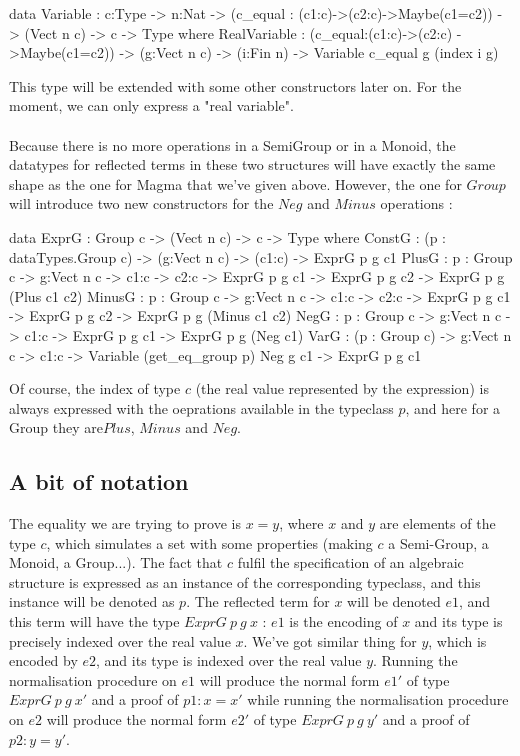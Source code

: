 \documentclass{sigplanconf}
\begin{document}
\begin{code}[caption=Reflected variables, captionpos=b, label=lst1:haskell2]  
data Variable : {c:Type} -> {n:Nat}
  -> (c_equal : (c1:c)->(c2:c)->Maybe(c1=c2)) 
  -> (Vect n c) -> c -> Type where
    RealVariable : (c_equal:(c1:c)->(c2:c)
                    ->Maybe(c1=c2))
          -> (g:Vect n c) -> (i:Fin n) 
          -> Variable c_equal g (index i g) 
\end{code}	

This type will be extended with some other constructors later on. For the moment, we can only express a "real variable". \\
\\
Because there is no more operations in a SemiGroup or in a Monoid, the datatypes for reflected terms in these two structures will have exactly the same shape as the one for Magma that we've given above.
However, the one for $Group$ will introduce two new constructors for the $Neg$ and $Minus$ operations :

\begin{code}[caption=Reflected terms in a Group, captionpos=b, label=lst1:haskell2]
data ExprG :  Group c -> (Vect n c) -> c -> 
              Type where
    ConstG : (p : dataTypes.Group c) 
       -> (g:Vect n c)
       -> (c1:c) -> ExprG p g c1
    PlusG : {p : Group c} -> {g:Vect n c} 
       -> {c1:c} -> {c2:c} 
       -> ExprG p g c1 
       -> ExprG p g c2 
       -> ExprG p g (Plus c1 c2)
    MinusG : {p : Group c} -> {g:Vect n c} 
       -> {c1:c} -> {c2:c} 
       -> ExprG p g c1 
       -> ExprG p g c2 
       -> ExprG p g (Minus c1 c2)
    NegG : {p : Group c} -> {g:Vect n c} 
       -> {c1:c} -> ExprG p g c1 
       -> ExprG p g (Neg c1)
    VarG : (p : Group c) -> {g:Vect n c} 
       -> {c1:c}
       -> Variable (get_eq_group p) Neg g c1 
       -> ExprG p g c1
\end{code}

Of course, the index of type $c$ (the real value represented by the expression) is always expressed with the oeprations available in the typeclass $p$, and here for a Group they are$Plus$, $Minus$ and $Neg$.

	\subsection { A bit of notation}
The equality we are trying to prove is $x=y$, where $x$ and $y$ are elements of the type $c$, which  simulates a set with some properties (making $c$ a Semi-Group, a Monoid, a Group...). The fact that $c$ fulfil the specification of an algebraic structure is expressed as an instance of the corresponding typeclass, and this instance will be denoted as $p$.
The reflected term for $x$ will be denoted $e1$, and this term will have the type $ExprG\ p\ g\ x$ : $e1$ is the encoding of $x$ and its type is precisely indexed over the real value $x$.
We've got similar thing for $y$, which is encoded by $e2$, and its type is indexed over the real value $y$.
Running the normalisation procedure on $e1$ will produce the normal form $e1'$ of type $ExprG\ p\ g\ x'$ and a proof of $p1:x=x'$ while running the normalisation procedure on $e2$ will produce the normal form $e2'$ of type $ExprG\ p\ g\ y'$ and a proof of $p2:y=y'$.
\end{document}
